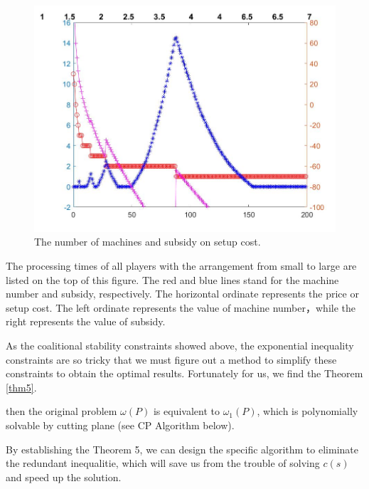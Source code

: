 \begin{figure}[h]%
	\centering  %
	\includegraphics[width=0.8\linewidth]{Figures/Image30}  %
	\caption{The number of machines and subsidy on setup cost.}  %
	\label{fig:Image11}   %
\end{figure}

The processing times of all players with the arrangement from small to large are listed on the top of this figure.
The red and blue lines stand for the machine number and subsidy, respectively.
The horizontal ordinate represents the price or setup cost.
The left ordinate represents the value of machine number，while the right represents the value of subsidy.

As the coalitional stability constraints showed above, the exponential inequality constraints are so tricky that we must figure out a method to simplify these constraints to obtain the optimal results. Fortunately for us, we find the Theorem \ref{thm5}.

\begin{thm}\label{thm5}
then the original problem $\omega(P)$ is equivalent to $\omega_1(P)$, which is polynomially solvable by cutting plane (see CP Algorithm below).

\end{thm}

By establishing the Theorem 5, we can design the specific algorithm to eliminate the redundant inequalitie, which will save us from the trouble of solving $c(s)$ and speed up the solution.
